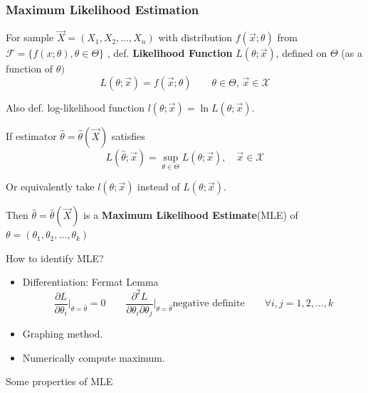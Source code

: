 \subsubsection{Maximum Likelihood Estimation}\label{SubSectionMLE}
    For sample $\vec{X}=(X_1,X_2,\ldots,X_n)$ with distribution $f(\vec{x};\theta)$ from $\mathscr{F}=\{f(x;\theta),\theta\in\Theta\}$ , def. \textbf{Likelihood Function} $L(\theta;\vec{x})$, defined on $\Theta$ (as a function of $\theta)$
    \begin{equation}
        L(\theta;\vec{x})=f(\vec{x};\theta)\qquad \theta\in\Theta,\,\vec{x}\in\mathscr{X}    
    \end{equation}

    Also def. log-likelihood function $l(\theta;\vec{x})=\ln L(\theta;\vec{x})$.

    If estimator $\hat{\theta}=\hat{\theta}(\vec{X})$ satisfies
    \begin{equation}
        L(\hat{\theta};\vec{x})=\sup_{\theta\in\Theta}L(\theta;\vec{x}),\quad \vec{x}\in\mathscr{X}
    \end{equation}

    Or equivalently take $l(\theta;\vec{x})$ instead of $L(\theta;\vec{x})$.

    Then $\hat{\theta}=\hat{\theta}(\vec{X})$ is a \textbf{Maximum Likelihood Estimate}(MLE) of $\theta=(\theta_1,\theta_2,\ldots,\theta_k)$

    How to identify MLE?
    \begin{itemize}
        \item Differentiation: Fermat Lemma
        \begin{equation}
            \frac{\partial L}{\partial \theta_i}\bigg|_{\theta=\hat{\theta}}=0\qquad \frac{\partial^2 L}{\partial \theta_i \partial \theta_j}\bigg|_{\theta=\hat{\theta}}\text{negative definite}\qquad \forall i,j=1,2,\ldots,k
        \end{equation}
        \item Graphing method.
        \item Numerically compute maximum.
    \end{itemize}

    \begin{point}
        Some properties of MLE
    \end{point}
    
